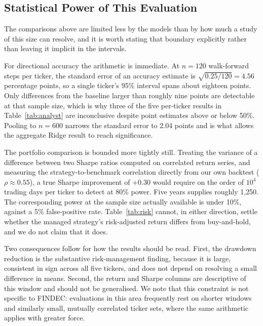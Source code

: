 \documentclass[conference]{IEEEtran}
\begin{document}
\subsection{Statistical Power of This Evaluation}
\label{sec:power}

The comparisons above are limited less by the models than by how much a study of this size can resolve, and it is worth stating that boundary explicitly rather than leaving it implicit in the intervals.

For directional accuracy the arithmetic is immediate. At $n=120$ walk-forward steps per ticker, the standard error of an accuracy estimate is $\sqrt{0.25/120} = 4.56$ percentage points, so a single ticker's 95\% interval spans about eighteen points. Only differences from the baseline larger than roughly nine points are detectable at that sample size, which is why three of the five per-ticker results in Table~\ref{tab:analyst} are inconclusive despite point estimates above or below 50\%. Pooling to $n=600$ narrows the standard error to 2.04 points and is what allows the aggregate Ridge result to reach significance.

The portfolio comparison is bounded more tightly still. Treating the variance of a difference between two Sharpe ratios computed on correlated return series, and measuring the strategy-to-benchmark correlation directly from our own backtest ($\rho \approx 0.55$), a true Sharpe improvement of $+0.30$ would require on the order of $10^4$ trading days per ticker to detect at 80\% power. Five years supplies roughly 1{,}250. The corresponding power at the sample size actually available is under 10\%, against a 5\% false-positive rate. Table~\ref{tab:risk} cannot, in either direction, settle whether the managed strategy's risk-adjusted return differs from buy-and-hold, and we do not claim that it does.

Two consequences follow for how the results should be read. First, the drawdown reduction is the substantive risk-management finding, because it is large, consistent in sign across all five tickers, and does not depend on resolving a small difference in means. Second, the return and Sharpe columns are descriptive of this window and should not be generalised. We note that this constraint is not specific to FINDEC: evaluations in this area frequently rest on shorter windows and similarly small, mutually correlated ticker sets, where the same arithmetic applies with greater force.

\end{document}
